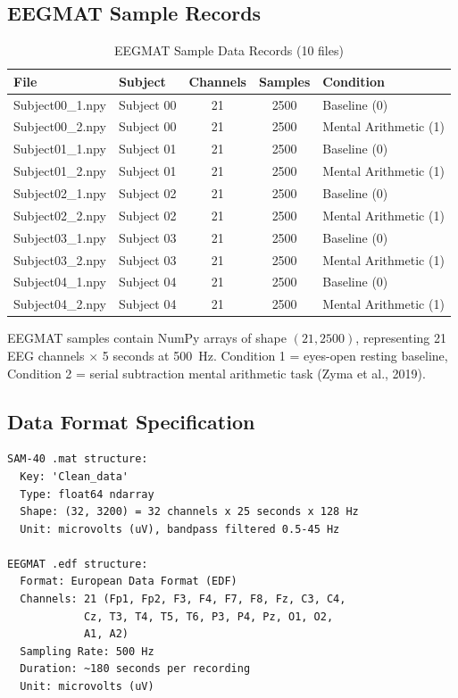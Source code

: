 \documentclass[11pt,a4paper]{article}
\begin{document}
\subsection{EEGMAT Sample Records}

\begin{table}[H]
\centering
\caption{EEGMAT Sample Data Records (10 files)}
\small
\begin{tabular}{llccl}
\toprule
\textbf{File} & \textbf{Subject} & \textbf{Channels} & \textbf{Samples} & \textbf{Condition} \\
\midrule
Subject00\_1.npy & Subject 00 & 21 & 2500 & Baseline (0) \\
Subject00\_2.npy & Subject 00 & 21 & 2500 & Mental Arithmetic (1) \\
Subject01\_1.npy & Subject 01 & 21 & 2500 & Baseline (0) \\
Subject01\_2.npy & Subject 01 & 21 & 2500 & Mental Arithmetic (1) \\
Subject02\_1.npy & Subject 02 & 21 & 2500 & Baseline (0) \\
Subject02\_2.npy & Subject 02 & 21 & 2500 & Mental Arithmetic (1) \\
Subject03\_1.npy & Subject 03 & 21 & 2500 & Baseline (0) \\
Subject03\_2.npy & Subject 03 & 21 & 2500 & Mental Arithmetic (1) \\
Subject04\_1.npy & Subject 04 & 21 & 2500 & Baseline (0) \\
Subject04\_2.npy & Subject 04 & 21 & 2500 & Mental Arithmetic (1) \\
\bottomrule
\end{tabular}
\end{table}

\noindent EEGMAT samples contain NumPy arrays of shape $(21, 2500)$, representing 21 EEG channels $\times$ 5 seconds at 500~Hz. Condition 1 = eyes-open resting baseline, Condition 2 = serial subtraction mental arithmetic task (Zyma et al., 2019).

\subsection{Data Format Specification}

\begin{verbatim}
SAM-40 .mat structure:
  Key: 'Clean_data'
  Type: float64 ndarray
  Shape: (32, 3200) = 32 channels x 25 seconds x 128 Hz
  Unit: microvolts (uV), bandpass filtered 0.5-45 Hz

EEGMAT .edf structure:
  Format: European Data Format (EDF)
  Channels: 21 (Fp1, Fp2, F3, F4, F7, F8, Fz, C3, C4,
            Cz, T3, T4, T5, T6, P3, P4, Pz, O1, O2,
            A1, A2)
  Sampling Rate: 500 Hz
  Duration: ~180 seconds per recording
  Unit: microvolts (uV)
\end{verbatim}
\end{document}
